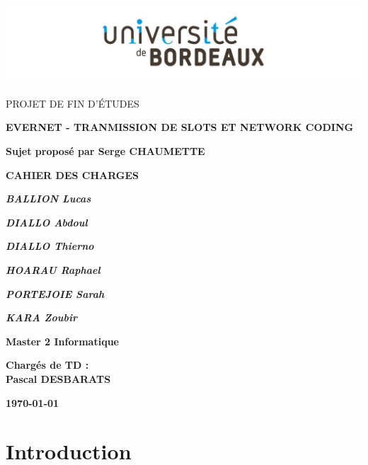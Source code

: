\documentclass[a4paper, 12pt]{article}
\begin{document}
\begin{titlepage}
	\centering
	\includegraphics[width=1\textwidth]{univ.jpg}\par\vspace{1cm}
	{\scshape\LARGE PROJET DE FIN D'ÉTUDES\par}
	\vspace{1cm}
	{\scshape\Large\bfseries EVERNET - TRANMISSION DE SLOTS ET NETWORK CODING
 \par}
 	\vspace{0.5cm}
 {\Large\bfseries Sujet proposé par Serge CHAUMETTE \par}
 
 	
	\vspace{1.5cm}
	{\huge\bfseries CAHIER DES CHARGES  \par}
	\vspace{1cm}
	
	
	{\Large\itshape\bfseries BALLION Lucas  \par}
	{\Large\itshape\bfseries DIALLO Abdoul   \par}
	{\Large\itshape\bfseries DIALLO Thierno   \par}
	{\Large\itshape\bfseries HOARAU Raphael   \par}
	{\Large\itshape\bfseries PORTEJOIE Sarah  \par}
	{\Large\itshape\bfseries KARA Zoubir  \par}
		

	\vspace{1cm}
	
	
	{\Large\bfseries Master 2 Informatique   \par}
	\vspace{0.5cm}
	{\Large\bfseries Chargés de TD : \\
	Pascal DESBARATS	   \par}
	\vspace{1.5cm}

	
	
	{\large\bfseries \today\par}
\end{titlepage}

\tableofcontents
\newpage
\section{Introduction}
\end{document}

